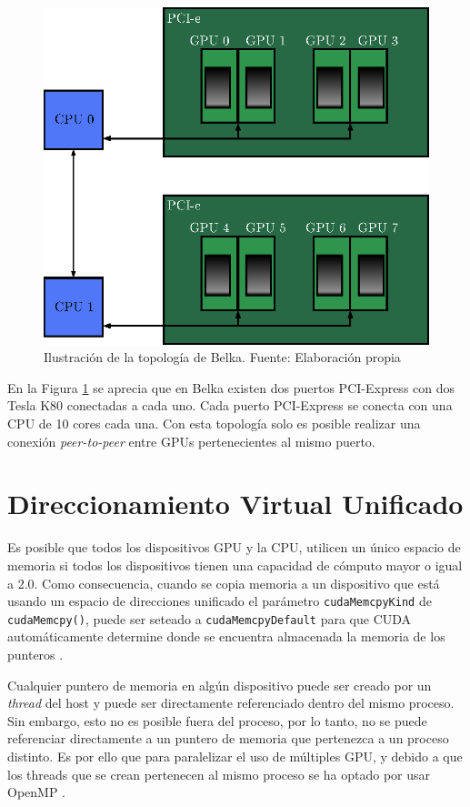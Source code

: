\begin{figure}[h!]
	\centering
	\includegraphics[scale=0.8]{./images/p2p.eps}
	\caption{Ilustración de la topología de Belka. Fuente: Elaboración propia}
	\label{fig:belkap2p}
\end{figure}

En la Figura \ref{fig:belkap2p} se aprecia que en Belka existen dos puertos PCI-Express con dos Tesla K80 conectadas a cada uno. Cada puerto PCI-Express se conecta con una CPU de 10 cores cada una. Con esta topología solo es posible realizar una conexión \textit{peer-to-peer} entre GPUs pertenecientes al mismo puerto.

\section{Direccionamiento Virtual Unificado}

Es posible que todos los dispositivos GPU y la CPU, utilicen un único espacio de memoria si todos los dispositivos tienen una capacidad de cómputo mayor o igual a 2.0. Como consecuencia, cuando se copia memoria a un dispositivo que está usando un espacio de direcciones unificado el parámetro \texttt{cudaMemcpyKind} de \texttt{cudaMemcpy()}, puede ser seteado a \texttt{cudaMemcpyDefault} para que CUDA automáticamente determine donde se encuentra almacenada la memoria de los punteros \citep{cuda}.

Cualquier puntero de memoria en algún dispositivo puede ser creado por un \textit{thread} del host y puede ser directamente referenciado dentro del mismo proceso. Sin embargo, esto no es posible fuera del proceso, por lo tanto, no se puede referenciar directamente a un puntero de memoria que pertenezca a un proceso distinto. Es por ello que para paralelizar el uso de múltiples GPU, y debido a que los threads que se crean pertenecen al mismo proceso se ha optado por usar OpenMP \citep{cuda}.

